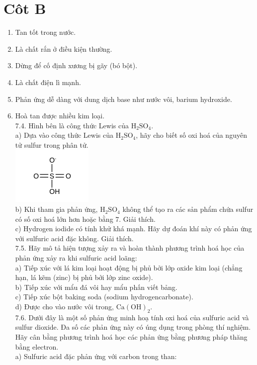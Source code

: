 \documentclass[10pt]{article}
\begin{document}
\section*{Côt B}
\begin{enumerate}
  \item Tan tốt trong nước.
  \item Là chất rắn ở điều kiện thường.
  \item Dừng để cố định xương bị gãy (bó bột).
  \item Là chất điện lì mạnh.
  \item Phản ứng dễ dàng với dung dịch base như nước vôi, barium hydroxide.
  \item Hoà tan được nhiều kim loại.\\
7.4. Hình bên là công thức Lewis của $\mathrm{H}_{2} \mathrm{SO}_{4}$.\\
a) Dựa vào công thức Lewis của $\mathrm{H}_{2} \mathrm{SO}_{4}$, hãy cho biết số oxi hoá của nguyên tử sulfur trong phân tử.\\
\includegraphics{smile-273326f278a4f10996755ca6a410142585b2caa5}\\
b) Khi tham gia phản ứng, $\mathrm{H}_{2} \mathrm{SO}_{4}$ không thể tạo ra các sản phẩm chứa sulfur có số oxi hoá lớn hơn hoặc bằng 7. Giải thích.\\
c) Hydrogen iodide có tính khử khá mạnh. Hãy dự đoán khí này có phản ứng với sulfuric acid đặc không. Giải thích.\\
7.5. Hãy mô tả hiện tượng xảy ra và hoàn thành phương trình hoá học của phản ứng xảy ra khi sulfuric acid loãng:\\
a) Tiếp xúc với lá kim loại hoạt động bị phủ bởi lớp oxide kim loại (chẳng hạn, lá kẽm (zinc) bị phủ bởi lớp zinc oxide).\\
b) Tiếp xúc với mẩu đá vôi hay mẩu phấn viết bảng.\\
c) Tiếp xúc bột baking soda (sodium hydrogencarbonate).\\
d) Được cho vào nước vôi trong, $\mathrm{Ca}(\mathrm{OH})_{2}$.\\
7.6. Dưới đây là một số phản ứng minh hoạ tính oxi hoá của sulfuric acid và sulfur dioxide. Đa số các phản ứng này có úng dụng trong phòng thí nghiệm. Hãy cân bằng phương trình hoá học các phản ứng bằng phương pháp thăng bằng electron.\\
a) Sulfuric acid đặc phản ứng với carbon trong than:
\end{enumerate}
\end{document}
